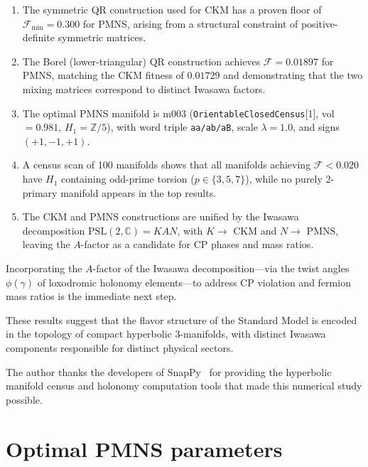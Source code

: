 \documentclass[floatfix,aps,prd,twocolumn,showpacs,superscriptaddress,longbibliography]{revtex4-2}
\newcommand{\PSL}{\mathrm{PSL}(2,\mathbb{C})}
\begin{document}
\begin{enumerate}
\item The symmetric QR construction used for CKM has a proven
floor of $\mathcal{F}_{\min} = 0.300$ for PMNS, arising from a
structural constraint of positive-definite symmetric matrices.

\item The Borel (lower-triangular) QR construction achieves
$\mathcal{F} = 0.01897$ for PMNS, matching the CKM fitness of
$0.01729$ and demonstrating that the two mixing matrices
correspond to distinct Iwasawa factors.

\item The optimal PMNS manifold is m003
(\texttt{OrientableClosedCensus}[1], vol $= 0.981$,
$H_1 = \mathbb{Z}/5$), with word triple \texttt{aa/ab/aB},
scale $\lambda = 1.0$, and signs $(+1, -1, +1)$.

\item A census scan of 100 manifolds shows that all manifolds
achieving $\mathcal{F} < 0.020$ have $H_1$ containing odd-prime
torsion ($p \in \{3, 5, 7\}$), while no purely 2-primary manifold
appears in the top results.

\item The CKM and PMNS constructions are unified by the Iwasawa
decomposition $\PSL = KAN$, with $K \to$ CKM and $N \to$ PMNS,
leaving the $A$-factor as a candidate for CP phases and mass ratios.
\end{enumerate}

Incorporating the $A$-factor of the Iwasawa decomposition---via
the twist angles $\phi(\gamma)$ of loxodromic holonomy elements---to
address CP violation and fermion mass ratios is the immediate next step.

These results suggest that the flavor structure of the Standard Model
is encoded in the topology of compact hyperbolic 3-manifolds, with
distinct Iwasawa components responsible for distinct physical sectors.

\begin{acknowledgments}
The author thanks the developers of SnapPy~\cite{snappy} for
providing the hyperbolic manifold census and holonomy computation
tools that made this numerical study possible.
\end{acknowledgments}

\appendix

\section{Optimal PMNS parameters}
\label{app:params}
\end{document}
